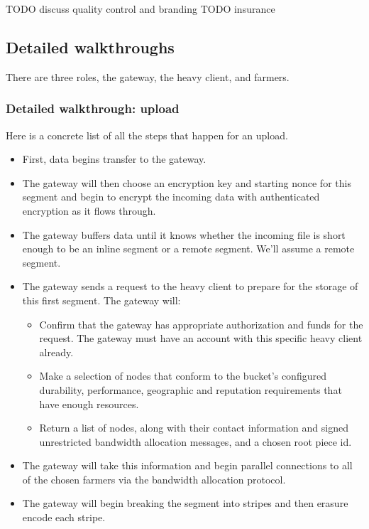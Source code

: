 \documentclass[a4paper,10pt]{article} \usepackage[utf8]{inputenc}
\newcommand{\todo}[1]{{\color{red} TODO #1 }}
\begin{document}
\todo{discuss quality control and branding}
\todo{insurance}

\subsection{Detailed walkthroughs}

There are three roles, the gateway, the heavy client, and farmers.

\subsubsection{Detailed walkthrough: upload}

Here is a concrete list of all the steps that happen for an upload.

\begin{itemize}
\item First, data begins transfer to the gateway.
\item The gateway will then choose an encryption key and starting nonce for
  this segment and begin to encrypt the incoming data with authenticated
  encryption as it flows through.
\item The gateway buffers data until it knows whether the incoming file is
short enough to be an inline segment or a remote segment. We'll assume a remote
segment.
\item The gateway sends a request to the heavy client to prepare for the storage
of this first segment. The gateway will:
  \begin{itemize}
  \item Confirm that the gateway has appropriate authorization and funds for
    the request. The gateway must have an account with this specific heavy
    client already.
  \item Make a selection of nodes that conform to the bucket's configured
    durability, performance, geographic and reputation requirements that have
    enough resources.
  \item Return a list of nodes, along with their contact information and
    signed unrestricted bandwidth allocation messages, and a chosen root piece
    id.
  \end{itemize}
\item The gateway will take this information and begin parallel connections to
  all of the chosen farmers via the bandwidth allocation protocol.
\item The gateway will begin breaking the segment into stripes and then
  erasure encode each stripe.

\end{itemize}
\end{document}
